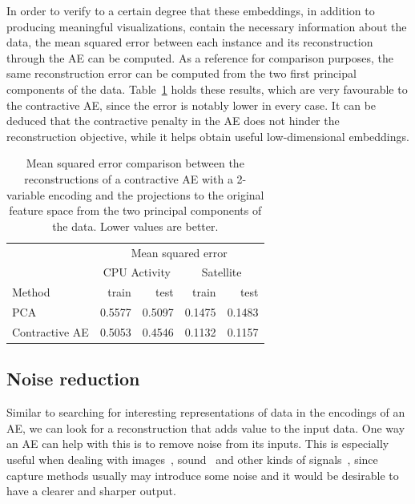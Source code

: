 In order to verify to a certain degree that these embeddings, in addition to producing meaningful visualizations,  contain the necessary information about the data, the mean squared error between each instance and its reconstruction through the AE can be computed. As a reference for comparison purposes, the same reconstruction error can be computed from the two first principal components of the data. Table~\ref{p5tbl:mse} holds these results, which are very favourable to the contractive AE, since the error is notably lower in every case. It can be deduced that the contractive penalty in the AE does not hinder the reconstruction objective, while it helps obtain useful low-dimensional embeddings.

\begin{table}[ht]
    \centering
    \begin{tabular}{lrrrr}
        \toprule
         & \multicolumn{4}{c}{Mean squared error} \\
            \cmidrule(r){2-5}
             & \multicolumn{2}{c}{CPU Activity} & \multicolumn{2}{c}{Satellite} \\
            \cmidrule(r){2-5}
            Method & train & test & train & test \\
        \midrule
            PCA & 0.5577 & 0.5097 & 0.1475 & 0.1483 \\
            Contractive AE & 0.5053 & 0.4546 & 0.1132 & 0.1157 \\
        \bottomrule               
    \end{tabular}
    \caption{\label{p5tbl:mse}Mean squared error comparison between the reconstructions of a contractive AE with a 2-variable encoding and the projections to the original feature space from the two principal components of the data. Lower values are better.}
\end{table}

\subsection{Noise reduction}

Similar to searching for interesting representations of data in the encodings of an AE, we can look for a reconstruction that adds value to the input data. One way an AE can help with this is to remove noise from its inputs. This is especially useful when dealing with images~\cite{xie}, sound~\cite{speech} and other kinds of signals~\cite{ecg}, since capture methods usually may introduce some noise and it would be desirable to have a clearer and sharper output.


